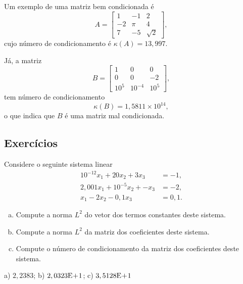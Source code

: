 \begin{ex}\label{ex:kappa}
  Um exemplo de uma matriz bem condicionada é
  \begin{equation}
    A =
    \begin{bmatrix}
      1 & -1 & 2\\
      -2 & \pi & 4\\
      7 & -5 & \sqrt{2}
    \end{bmatrix},
  \end{equation}
  cujo número de condicionamento é $\kappa(A) = 13,997$.

  Já, a matriz
  \begin{equation}
    B =
    \begin{bmatrix}
      1 & 0 & 0\\
      0 & 0 & -2\\
      10^{5} & 10^{-4} & 10^{5}
    \end{bmatrix},    
  \end{equation}
  tem número de condicionamento
  \begin{equation}
    \kappa(B) = 1,5811\times 10^{14},
  \end{equation}
  o que indica que $B$ é uma matriz mal condicionada.
\end{ex}

\subsection*{Exercícios}

\begin{exer}\label{exer:norma_numcond}
  Considere o seguinte sistema linear
  \begin{align}
    10^{-12}x_1 + 20x_2 + 3x_3 &= -1,\\
    2,001x_1 + 10^{-5}x_2 + - x_3 &= -2,\\
    x_1 - 2x_2 - 0,1x_3 &= 0,1.
  \end{align}
  \begin{enumerate}[a)]
  \item Compute a norma $L^2$ do vetor dos termos constantes deste sistema.
  \item Compute a norma $L^2$ da matriz dos coeficientes deste sistema.
  \item Compute o número de condicionamento da matriz dos coeficientes deste sistema.
  \end{enumerate}
\end{exer}
\begin{resp}
  a) $2,2383$; b) $2,0323\mathrm{E}\!+\!1$; c) $3,5128\mathrm{E}\!+\!1$
\end{resp}


